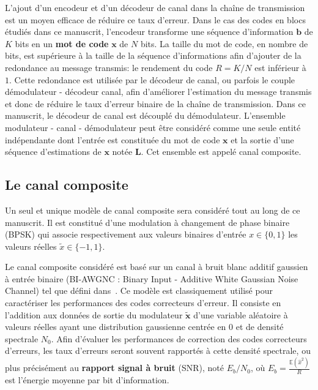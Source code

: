 L'ajout d'un encodeur et d'un décodeur de canal dans la chaîne de transmission est un moyen efficace de réduire ce taux d'erreur. Dans le cas des codes en blocs étudiés dans ce manuscrit, l'encodeur transforme une séquence d'information $\mathbold{b}$ de $K$ bits en un \textbf{mot de code} $\mathbold{x}$ de $N$ bits. La taille du mot de code, en nombre de bits, est supérieure à la taille de la séquence d'informations afin d'ajouter de la redondance au message transmis: le rendement du code $R=K/N$ est inférieur à $1$.  Cette redondance est utilisée par le décodeur de canal, ou parfois le couple démodulateur - décodeur canal, afin d'améliorer l'estimation du message transmis et donc de réduire le taux d'erreur binaire de la chaîne de transmission. Dans ce manuscrit, le décodeur de canal est découplé du démodulateur. L'ensemble modulateur - canal - démodulateur peut être considéré comme une seule entité indépendante dont l'entrée est constituée du mot de code $\mathbold{x}$ et la sortie d'une séquence d'estimations de $\mathbold{x}$ notée $\mathbold{L}$. Cet ensemble est appelé canal composite.

\subsection{Le canal composite}
\label{subsec:canal}

Un seul et unique modèle de canal composite sera considéré tout au long de ce manuscrit. Il est constitué d'une modulation à changement de phase binaire (BPSK) qui associe respectivement aux valeurs binaires d'entrée $x\in\{0,1\}$ les valeurs réelles $\tilde{x}\in\{-1,1\}$.

Le canal composite considéré est basé sur un canal à bruit blanc additif gaussien à entrée binaire (BI-AWGNC : Binary Input - Additive White Gaussian Noise Channel) tel que défini dans~\cite[section~1.5.1.3]{ryan2009channel}. Ce modèle est classiquement utilisé pour caractériser les performances des codes correcteurs d'erreur. Il consiste en l'addition aux données de sortie du modulateur $\mathbold{\tilde{x}}$ d'une variable aléatoire à valeurs réelles ayant une distribution gaussienne centrée en $0$ et de densité spectrale $N_0$. Afin d'évaluer les performances de correction des codes correcteurs d'erreurs, les taux d'erreurs seront souvent rapportés à cette densité spectrale, ou plus précisément au \textbf{rapport signal à bruit} (SNR), noté $E_b/N_0$, où $E_b=\frac{\mathbb{E}(\hat{x}^2)}{R}$ est l'énergie moyenne par bit d'information.


